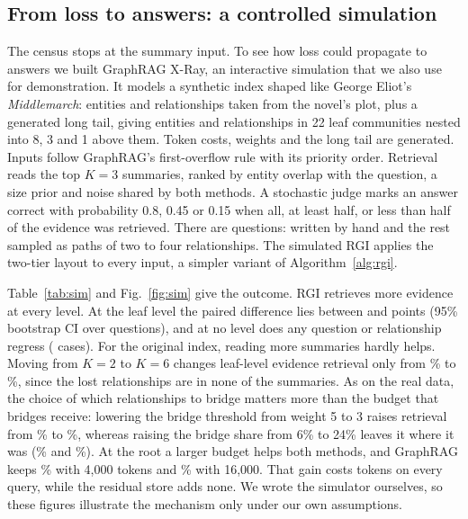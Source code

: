 \documentclass[journal]{IEEEtran}
\theoremstyle{remark}
\begin{document}
\subsection{From loss to answers: a controlled simulation}\label{sec:sim}
The census stops at the summary input. To see how loss could propagate to answers we built GraphRAG X-Ray, an interactive simulation that we also use for demonstration. It models a synthetic index shaped like George Eliot's \emph{Middlemarch}: \SimCoreEntities{} entities and \SimCoreRels{} relationships taken from the novel's plot, plus a generated long tail, giving \SimEntities{} entities and \SimRels{} relationships in 22 leaf communities nested into 8, 3 and 1 above them. Token costs, weights and the long tail are generated. Inputs follow GraphRAG's first-overflow rule with its priority order. Retrieval reads the top $K=3$ summaries, ranked by entity overlap with the question, a size prior and noise shared by both methods. A stochastic judge marks an answer correct with probability 0.8, 0.45 or 0.15 when all, at least half, or less than half of the evidence was retrieved. There are \SimQuestions{} questions: \SimFeatured{} written by hand and the rest sampled as paths of two to four relationships. The simulated RGI applies the two-tier layout to every input, a simpler variant of Algorithm~\ref{alg:rgi}.

Table~\ref{tab:sim} and Fig.~\ref{fig:sim} give the outcome. RGI retrieves more evidence at every level. At the leaf level the paired difference lies between \SimCIALo{} and \SimCIAHi{} points (95\% bootstrap CI over questions), and at no level does any question or relationship regress (\SimRegr{} cases). For the original index, reading more summaries hardly helps. Moving from $K=2$ to $K=6$ changes leaf-level evidence retrieval only from \SimKTwoO\% to \SimKSixO\%, since the lost relationships are in none of the summaries. As on the real data, the choice of which relationships to bridge matters more than the budget that bridges receive: lowering the bridge threshold from weight 5 to 3 raises retrieval from \SimBMFive\% to \SimBMThree\%, whereas raising the bridge share from 6\% to 24\% leaves it where it was (\SimBSSix\% and \SimBSTwentyFour\%). At the root a larger budget helps both methods, and GraphRAG keeps \SimBudFourO\% with 4,000 tokens and \SimBudSixteenO\% with 16,000. That gain costs tokens on every query, while the residual store adds none. We wrote the simulator ourselves, so these figures illustrate the mechanism only under our own assumptions.
\end{document}
